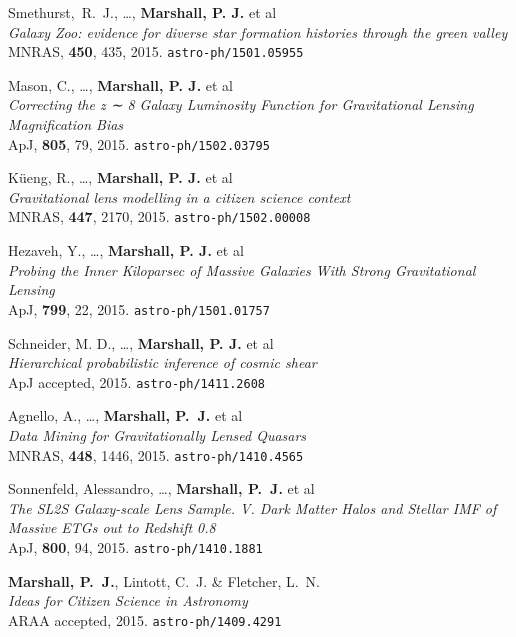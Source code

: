 \begin{revnumerate}
\item{Smethurst,~R.~J., \ldots, \textbf{Marshall, P. J.} et al\\
\textit{Galaxy Zoo: evidence for diverse star formation histories through the green valley}\\
MNRAS, \textbf{450}, 435, 2015.
\texttt{astro-ph/1501.05955}
}

\item{Mason, C., \ldots, \textbf{Marshall, P. J.} et al\\
\textit{Correcting the z ∼ 8 Galaxy Luminosity Function for Gravitational Lensing Magnification Bias}\\
ApJ, \textbf{805}, 79, 2015.
\texttt{astro-ph/1502.03795}
}

\item{K\"{u}eng, R., \ldots, \textbf{Marshall, P. J.} et al\\
\textit{Gravitational lens modelling in a citizen science context}\\
MNRAS, \textbf{447}, 2170, 2015.
\texttt{astro-ph/1502.00008}
}

\item{Hezaveh, Y., \ldots, \textbf{Marshall, P. J.} et al\\
\textit{Probing the Inner Kiloparsec of Massive Galaxies With Strong Gravitational Lensing}\\
ApJ, {\bf 799}, 22, 2015.
\texttt{astro-ph/1501.01757}
}

\item{Schneider, M. D., \ldots, \textbf{Marshall, P. J.} et al\\
\textit{Hierarchical probabilistic inference of cosmic shear}\\
ApJ accepted, 2015.
\texttt{astro-ph/1411.2608}
}

\item{Agnello, A., \ldots, \textbf{Marshall, P.~J.} et al\\
\textit{Data Mining for Gravitationally Lensed Quasars}\\
MNRAS, \textbf{448}, 1446, 2015.
\texttt{astro-ph/1410.4565}
}

\item{Sonnenfeld, Alessandro, \ldots, \textbf{Marshall, P.~J.} et al\\
\textit{The SL2S Galaxy-scale Lens Sample. V. Dark Matter Halos and Stellar IMF of Massive ETGs out to Redshift 0.8}\\
ApJ, \textbf{800}, 94, 2015.
\texttt{astro-ph/1410.1881}
}

\item{\textbf{Marshall, P.~J.}, Lintott, C.~J. \& Fletcher, L.~N.\\
\textit{Ideas for Citizen Science in Astronomy}\\
ARAA accepted, 2015.
\texttt{astro-ph/1409.4291}
}


\end{revnumerate}
